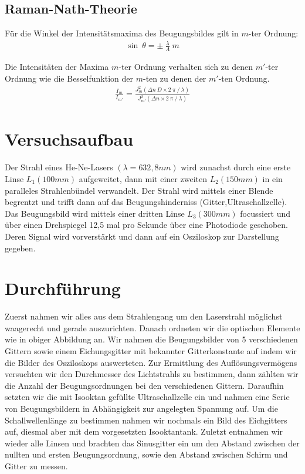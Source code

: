 \documentclass[12pt]{article}
\begin{document}
\subsection{Raman-Nath-Theorie}
Für die Winkel der Intensitätsmaxima des Beugungsbildes gilt in $m$-ter Ordnung:
\begin{align}
 \sin~\theta = \pm~\frac{\lambda}{\Lambda}~m
\end{align}

Die Intensitäten der Maxima $m$-ter Ordnung verhalten sich zu denen $m'$-ter Ordnung wie die Besselfunktion der $m$-ten zu denen der $m'$-ten Ordnung.
\begin{align}
 \frac{I_m}{I_{m'}} = \frac{J^2_m(\Delta n~D \times 2~\pi~/~\lambda)}{J^2_{m'}(\Delta n \times 2~\pi~/~\lambda)}
\end{align}

\newpage

\section{Versuchsaufbau}
Der Strahl eines He-Ne-Lasers $(\lambda = 632,8nm)$ wird zunachst durch eine erste Linse $L_1(100mm)$ aufgeweitet, dann mit einer zweiten $L_2(150mm)$ in ein paralleles Strahlenbündel verwandelt. Der Strahl wird mittels einer Blende begrentzt und trifft dann auf das Beugungshinderniss (Gitter,Ultraschallzelle). Das Beugungsbild wird mittels einer dritten Linse $L_3(300mm)$ focussiert und über einen Drehspiegel 12,5 mal pro Sekunde über eine Photodiode geschoben. Deren Signal wird vorverstärkt und dann auf ein Osziloskop zur Darstellung gegeben.

\section{Durchführung}
Zuerst nahmen wir alles aus dem Strahlengang um den Laserstrahl möglichst waagerecht und gerade auszurichten. Danach ordneten wir die optischen Elemente wie in obiger Abbildung an. Wir nahmen die Beugungsbilder von 5 verschiedenen Gittern sowie einem Eichungsgitter mit bekannter Gitterkonstante auf indem wir die Bilder des Osziloskops auswerteten. Zur Ermittlung des Auflösungsvermögens versuchten wir den Durchmesser des Lichtstrahls zu bestimmen, dann zählten wir die Anzahl der Beugungsordnungen bei den verschiedenen Gittern. Daraufhin setzten wir die mit Isooktan gefüllte Ultraschallzelle ein und nahmen eine Serie von Beugungsbildern in Abhängigkeit zur angelegten Spannung auf. Um die Schallwellenlänge zu bestimmen nahmen wir nochmals ein Bild des Eichgitters auf, diesmal aber mit dem vorgesetzten Isooktantank.  Zuletzt entnahmen wir wieder alle Linsen und brachten das Sinusgitter ein um den
Abstand zwischen der nullten und ersten Beugungsordnung, sowie den Abstand zwischen Schirm und Gitter zu messen.
\end{document}
